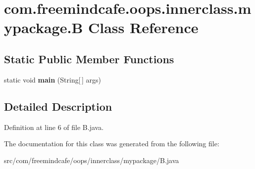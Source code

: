 \hypertarget{classcom_1_1freemindcafe_1_1oops_1_1innerclass_1_1mypackage_1_1_b}{}\section{com.\+freemindcafe.\+oops.\+innerclass.\+mypackage.\+B Class Reference}
\label{classcom_1_1freemindcafe_1_1oops_1_1innerclass_1_1mypackage_1_1_b}
\subsection*{Static Public Member Functions}
\begin{DoxyCompactItemize}
\item 
\hypertarget{classcom_1_1freemindcafe_1_1oops_1_1innerclass_1_1mypackage_1_1_b_af5f9dc3f065f799608be8521c7aca56c}{}static void {\bfseries main} (String\mbox{[}$\,$\mbox{]} args)\label{classcom_1_1freemindcafe_1_1oops_1_1innerclass_1_1mypackage_1_1_b_af5f9dc3f065f799608be8521c7aca56c}

\end{DoxyCompactItemize}


\subsection{Detailed Description}


Definition at line 6 of file B.\+java.



The documentation for this class was generated from the following file\+:\begin{DoxyCompactItemize}
\item 
src/com/freemindcafe/oops/innerclass/mypackage/B.\+java\end{DoxyCompactItemize}
